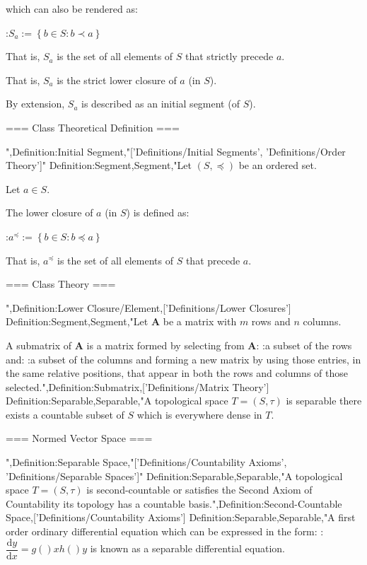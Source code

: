 which can also be rendered as:

:$S_a := \left\lbrace b \in S: b \prec a \right\rbrace$


That is, $S_a$ is the set of all elements of $S$ that strictly precede $a$.

That is, $S_a$ is the strict lower closure of $a$ (in $S$).


By extension, $S_a$ is described as an initial segment (of $S$).


=== Class Theoretical Definition ===

",Definition:Initial Segment,"['Definitions/Initial Segments', 'Definitions/Order Theory']"
Definition:Segment,Segment,"Let $\left( S, \preccurlyeq \right)$ be an ordered set.

Let $a \in S$.


The lower closure of $a$ (in $S$) is defined as:

:$a^\preccurlyeq := \left\lbrace b \in S: b \preccurlyeq a \right\rbrace$


That is, $a^\preccurlyeq$ is the set of all elements of $S$ that precede $a$.


=== Class Theory ===

",Definition:Lower Closure/Element,['Definitions/Lower Closures']
Definition:Segment,Segment,"Let $\mathbf A$ be a matrix with $m$ rows and $n$ columns.


A submatrix of $\mathbf A$ is a matrix formed by selecting from $\mathbf A$:
:a subset of the rows
and:
:a subset of the columns
and forming a new matrix by using those entries, in the same relative positions, that appear in both the rows and columns of those selected.",Definition:Submatrix,['Definitions/Matrix Theory']
Definition:Separable,Separable,"A topological space $T = \left( S, \tau \right)$ is separable  there exists a countable subset of $S$ which is everywhere dense in $T$.


=== Normed Vector Space ===


",Definition:Separable Space,"['Definitions/Countability Axioms', 'Definitions/Separable Spaces']"
Definition:Separable,Separable,"A topological space $T = \left( S, \tau \right)$ is second-countable or satisfies the Second Axiom of Countability  its topology has a countable basis.",Definition:Second-Countable Space,['Definitions/Countability Axioms']
Definition:Separable,Separable,"A first order ordinary differential equation which can be expressed in the form:
:$\dfrac {\mathrm d y} {\mathrm d x} = g \left(   \right)x h \left(   \right)y$
is known as a separable differential equation.


